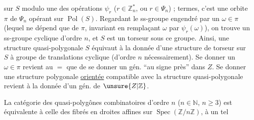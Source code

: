 sur $S$ modulo une des opérations $\psi_r$ ($r\in\mathbb Z_n^{*}$, ou $r\in\Psi_n$) ;   termes, c'est une orbite $\pi$ de $\Psi_n$ opérant sur $\operatorname{Pol}(S)$. Regardant le ss-groupe  engendré par un $\omega\in\pi$ (lequel ne dépend que de $\pi$,   invariant en remplaçant $\omega$ par $\psi_r(\omega)$), on trouve un ss-groupe cyclique d'ordre $n$, et $S$ est un torseur sous ce groupe. Ainsi, une structure quasi-polygonale  $S$ équivaut à la donnée d'une structure de torseur sur $S$ à groupe de  translations  cyclique (d'ordre $n$ nécessairement). Se donner un $\omega\in\pi$ revient au $=$ que de se donner un gén. ``au signe près'' dans $Z$. Se donner une structure polygonale \uline{orientée} compatible avec la structure quasi-polygonale revient à la donnée d'un gén. de $\unsure{Z|\mathbb Z}$.

La catégorie des  quasi-polygônes combinatoires d'ordre $n$ ($n\in\mathbb N$, $n\geq3$) est équivalente à celle des fibrés en droites affines sur $\operatorname{Spec}(\mathbb Z/n\mathbb Z)$, à un tel
